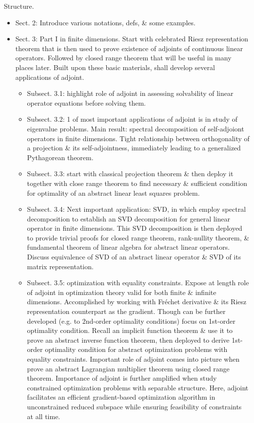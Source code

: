\documentclass{article}
\begin{document}
\begin{enumerate}
\begin{itemize}
		{\sf Structure.}
		\begin{itemize}
			\item Sect. 2: Introduce various notations, defs, \& some examples.
			\item Sect. 3: Part I in finite dimensions. Start with celebrated Riesz representation theorem that is then used to prove existence of adjoints of continuous linear operators. Followed by closed range theorem that will be useful in many places later. Built upon these basic materials, shall develop several applications of adjoint.
			\begin{itemize}
				\item Subsect. 3.1: highlight role of adjoint in assessing solvability of linear operator equations before solving them.
				\item Subsect. 3.2: 1 of most important applications of adjoint is in study of eigenvalue problems. Main result: spectral decomposition of self-adjoiont operators in finite dimensions. Tight relationship between orthogonality of a projection \& its self-adjointness, immediately leading to a generalized Pythagorean theorem.
				\item Subsect. 3.3: start with classical projection theorem \& then deploy it together with close range theorem to find necessary \& sufficient condition for optimality of an abstract linear least squares problem.
				\item Subsect. 3.4: Next important application: SVD, in which employ spectral decomposition to establish an SVD decomposition for general linear operator in finite dimensions. This SVD decomposition is then deployed to provide trivial proofs for closed range theorem, rank-nullity theorem, \& fundamental theorem of linear algebra for abstract linear operators. Discuss equivalence of SVD of an abstract linear operator \& SVD of its matrix representation.
				\item Subsect. 3.5: optimization with equality constraints. Expose at length role of adjoint in optimization theory valid for both finite \& infinite dimensions. Accomplished by working with Fr\'echet derivative \& its Riesz representation counterpart as the gradient. Though can be further developed (e.g. to 2nd-order optimality conditions) focus on 1st-order optimality condition. Recall an implicit function theorem \& use it to prove an abstract inverse function theorem, then deployed to derive 1st-order optimality condition for abstract optimization problems with equality constraints. Important role of adjoint comes into picture when prove an abstract Lagrangian multiplier theorem using closed range theorem. Importance of adjoint is further amplified when study constrained optimization problems with separable structure. Here, adjoint facilitates an efficient gradient-based optimization algorithm in unconstrained reduced subspace while ensuring feasibility of constraints at all time. 

\end{itemize}
\end{itemize}
\end{itemize}
\end{enumerate}
\end{document}
